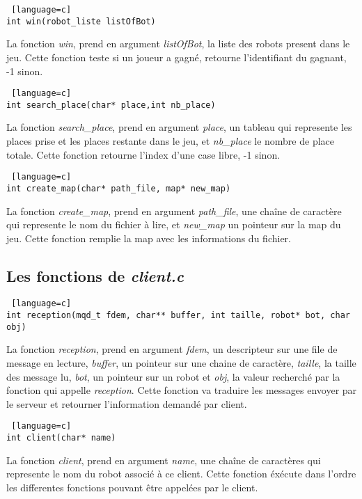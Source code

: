 \documentclass[a4paper, 11pt]{article}
\begin{document}
\begin {lstlisting} [language=c]
int win(robot_liste listOfBot)
\end{lstlisting}
La fonction \emph{win}, prend en argument \emph{listOfBot}, la liste des robots present dans le jeu. Cette fonction teste si un joueur a gagné, retourne l'identifiant du gagnant, -1 sinon.\\

\begin {lstlisting} [language=c]
int search_place(char* place,int nb_place)
\end{lstlisting}
La fonction \emph{search\_place}, prend en argument \emph{place}, un tableau qui represente les places prise et les places restante dans le jeu, et \emph{nb\_place} le nombre de place totale. Cette fonction retourne l'index d'une case libre, -1 sinon.\\

\begin {lstlisting} [language=c]
int create_map(char* path_file, map* new_map)
\end{lstlisting}
La fonction \emph{create\_map}, prend en argument \emph{path\_file}, une chaîne de caractère qui represente le nom du fichier à lire, et \emph{new\_map} un pointeur sur la map du jeu. Cette fonction remplie la map avec les informations du fichier.\\

\subsection{Les fonctions de \emph{client.c}}
\begin {lstlisting} [language=c]
int reception(mqd_t fdem, char** buffer, int taille, robot* bot, char obj)
\end{lstlisting}
La fonction \emph{reception}, prend en argument \emph{fdem}, un descripteur sur une file de message en lecture, \emph{buffer}, un pointeur sur une chaine de caractère, \emph{taille}, la taille des message lu, \emph{bot}, un pointeur sur un robot et \emph{obj}, la valeur recherché par la fonction qui appelle \emph{reception}. Cette fonction va traduire les messages envoyer par le serveur et retourner l'information demandé par client.\\

\begin {lstlisting} [language=c]
int client(char* name)
\end{lstlisting}
La fonction \emph{client}, prend en argument \emph{name}, une chaîne de caractères qui represente le nom du robot associé à ce client. Cette fonction éxécute dans l'ordre les differentes fonctions pouvant être appelées par le client.\\
\end{document}
